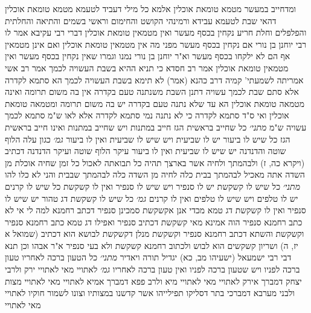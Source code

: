 \documentclass[12pt, openany]{book}
\begin{document}
{ומדחייב במעשר מטמא טומאת אוכלין אלמא  כל מילי דעביד לטעמא מטמא טומאת אוכלין דהאי שבת לטעמא עבידא 
ורמינהי  הקושט והחימום וראשי בשמים והתיאה והחלתית והפלפלים וחלת חריע נקחין בכסף מעשר ואין מטמאין טומאת אוכלין דברי רבי עקיבא 
אמר לו רבי יוחנן בן נורי  אם נקחין בכסף מעשר מפני מה אין מטמאין טומאת אוכלין  ואם אינן מטמאין אף הם לא ילקחו בכסף מעשר 
וא"ר יוחנן בן נורי  נמנו וגמרו שאין נקחין בכסף מעשר ואין מטמאין טומאת אוכלין 
אמר רב חסדא  כי תניא ההיא בשבת העשויה לכמך 
אמר רב אשי אמריתה לשמעתי' קמיה דרב כהנא  (אמר) לא תימא בשבת העשויה לכמך הא סתמא לקדרה אלא סתם שבת לכמך עשויה דתנן  השבת משנתנה טעם בקדרה אין בה משום תרומה ואינה מטמאה טומאת אוכלין 
הא עד שלא נתנה טעם בקדרה יש בה משום תרומה ומטמאה טומאת אוכלין  ואי ס"ד סתמא לקדרה כי לא נתנה נמי סתמא לקדרה  אלא לאו ש"מ סתמא לכמך עשויה  ש"מ
{\large\emph{מתני׳}} כל שחייב בראשית הגז חייב במתנות ויש שחייב במתנות ואינו חייב בראשית הגז
כל שיש לו ביעור יש לו שביעית ויש שיש לו שביעית ואין לו ביעור
{\large\emph{גמ׳}} כגון עלה הלוף שוטה והדנדנה יש שיש לו שביעית ואין לו ביעור עיקר הלוף שוטה ועיקר הדנדנה
דכתיב (ויקרא כה, ז) ולבהמתך ולחיה אשר בארצך תהיה כל תבואתה לאכול כל זמן שחיה אוכלת מן השדה אתה מאכיל לבהמתך בבית כלה לחיה מן השדה כלה לבהמתך שבבית והני לא כלו להו
{\large\emph{מתני׳}} כל שיש לו קשקשת יש לו סנפיר ויש שיש לו סנפיר ואין לו קשקשת כל שיש לו קרנים יש לו טלפים ויש שיש לו טלפים ואין לו קרנים
{\large\emph{גמ׳}} כל שיש לו קשקשת דג טהור יש שיש לו סנפיר ואין לו קשקשת דג טמא מכדי אנן אקשקשת סמכינן סנפיר דכתב רחמנא למה לי 
אי לא כתב רחמנא סנפיר הוה אמינא  מאי קשקשת דכתיב סנפיר ואפילו דג טמא כתב רחמנא סנפיר וקשקשת 
והשתא דכתב רחמנא סנפיר וקשקשת מנלן דקשקשת לבושא הוא  דכתיב (שמואל א יז, ה) ושריון קשקשים הוא לבוש 
ולכתוב רחמנא קשקשת ולא בעי סנפיר  א"ר אבהו וכן תנא דבי רבי ישמעאל  (ישעיהו מב, כא) יגדיל תורה ויאדיר
{\large\emph{מתני׳}} כל הטעון ברכה לאחריו טעון ברכה לפניו ויש שטעון ברכה לפניו ואין טעון ברכה לאחריו
{\large\emph{גמ׳}} לאתויי מאי לאתויי ירק  ולרבי יצחק דמברך אירק לאתויי מאי  לאתויי מיא 
ולרב פפא דמברך אמיא לאתויי מאי  לאתויי מצות  ולבני מערבא דמברכי בתר דסליקו תפילייהו אשר קדשנו במצותיו וצונו לשמור חוקיו לאתויי מאי  לאתויי}
\end{document}
